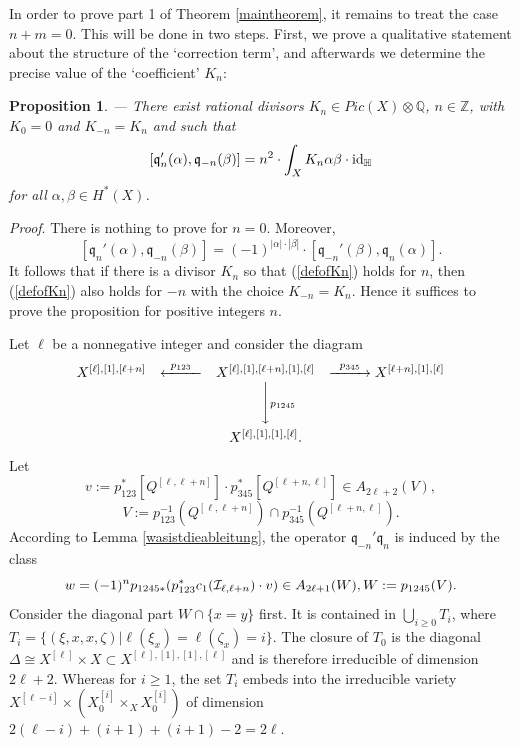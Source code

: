 \documentclass[twoside,11pt]{article}
\newtheorem{proposition}[theorem]{Proposition}
\newcommand{\prf}{{\kursiv Proof}. }
\newcommand{\beeq}[1]{\begin{eqnarray}\label{#1}}
\newcommand{\eneq}{\end{eqnarray}}
\newcommand{\kursiv}{\sl}
\newcommand{\ki}{{\cal I}}
\newcommand{\IH}{{\mathbb H}}
\newcommand{\IQ}{{\mathbb Q}}
\newcommand{\IZ}{{\mathbb Z}}
\newcommand{\gothq}{{\mathfrak q}}
\newcommand{\isom}{\cong}
\newcommand{\tensor}{\otimes}
\newcommand{\qq}{\gothq}
\newcommand{\id}{{\rm id}}
\newcommand{\verylongrightarrow}[1]{\raisebox{0mm}[0.9ex][0ex]{\hbox to #1{\rightarrowfill}}}
\newcommand{\verylongleftarrow}[1]{\raisebox{0mm}[0.9ex][0ex]{\hbox to #1{\leftarrowfill}}}
\begin{document}
In order to prove part 1 of Theorem \ref{maintheorem}, it remains to treat
the case $n+m=0$. This will be done in two steps. First, we prove a qualitative
statement about the structure of the `correction term', and afterwards we 
determine the precise value of the `coefficient' $K_n$:
 
\begin{proposition}\label{n-plus-m-gleichnull}--- There exist rational divisors $K_n\in Pic(X)\tensor\IQ$, $n\in \IZ$, with $K_0=0$ and $K_{-n}=K_n$ and such that
\beeq{defofKn}[\qq_n'(\alpha),\qq_{-n}(\beta)]=n^2\cdot\int_XK_n\alpha\beta\cdot\id_{\IH}
\eneq
for all $\alpha,\beta\in H^*(X)$.
\end{proposition}

\prf There is nothing to prove for $n=0$. Moreover, $$[\qq_n'(\alpha),\qq_{-n}(\beta)]=(-1)^{|\alpha|\cdot|\beta|}\cdot[\qq_{-n}'
(\beta),\qq_n(\alpha)].$$
It follows that if there is a divisor $K_n$ so that
(\ref{defofKn}) holds for $n$, then (\ref{defofKn}) also holds for $-n$ with
the choice $K_{-n}=K_n$. Hence it suffices to prove the proposition for
positive integers $n$.


Let $\ell$ be a nonnegative integer and consider the diagram
$$\begin{array}{ccccc}
X^{[\ell],[1],[\ell+n]}&\stackrel{p_{123}}{\verylongleftarrow{3em}}&
X^{[\ell],[1],[\ell+n],[1],[\ell]}&
\stackrel{p_{345}}{\verylongrightarrow{3em}} X^{[\ell+n],[1],[\ell]} \\
&&\phantom{\scriptstyle p_{1245}}\Bigg\downarrow
{\scriptstyle p_{1245}}\\[3ex]
&&X^{[\ell],[1],[1],[\ell]}.
\end{array}$$
Let 
$$v:=p_{123}^*[Q^{[\ell,\ell+n]}]\cdot p_{345}^*[Q^{[\ell+n,\ell]}]\in
A_{2\ell+2}(V),$$
{}$$V:=p_{123}^{-1}(Q^{[\ell,\ell+n]})\cap 
p_{345}^{-1}(Q^{[\ell+n,\ell]}).$$
According to Lemma \ref{wasistdieableitung}, the operator $\qq_{-n}'\qq_n$
is induced by the class
$$w=(-1)^np_{1245*}(p_{123}^*c_1(\ki_{\ell,\ell+n})\cdot v)\in A_{2\ell+1}(W), W:=p_{1245}(V).$$
Consider the diagonal part $W\cap\{x=y\}$ first. It is contained in
$\bigcup_{i\geq0}T_i$, where
$T_i=\{(\xi,x,x,\zeta)|\ell(\xi_x)=\ell(\zeta_x)=i\}$.
The closure of $T_0$ is the diagonal $\Delta\isom
X^{[\ell]}\times X\subset X^{[\ell],[1],[1],[\ell]}$ and is therefore 
irreducible of dimension $2\ell+2$. Whereas for $i\geq 1$, the set $T_i$
embeds into the irreducible variety $X^{[\ell-i]}\times (X^{[i]}_0\times_X
X^{[i]}_0)$ of dimension $2(\ell-i)+(i+1)+(i+1)-2=2\ell$.
\end{document}
